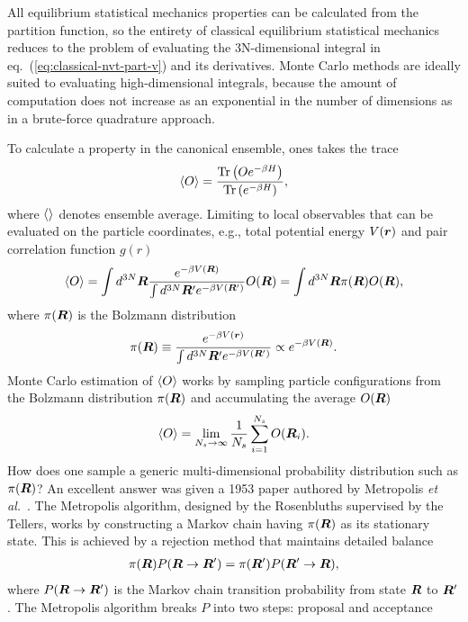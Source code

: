 All equilibrium statistical mechanics properties can be calculated from the partition function, so the entirety of classical equilibrium statistical mechanics reduces to the problem of evaluating the 3N-dimensional integral in eq.~(\ref{eq:classical-nvt-part-v}) and its derivatives. Monte Carlo methods are ideally suited to evaluating high-dimensional integrals, because the amount of computation does not increase as an exponential in the number of dimensions as in a brute-force quadrature approach.

To calculate a property in the canonical ensemble, ones takes the trace
\begin{align}
\braket{O} = \dfrac{\text{Tr}\left(Oe^{-\beta H}\right)}{\text{Tr}\left(e^{-\beta H}\right)},
\end{align}
where $\braket{}$ denotes ensemble average. Limiting to local observables that can be evaluated on the particle coordinates, e.g., total potential energy $V(\boldsymbol{r})$ and pair correlation function $g(r)$
\begin{align} \label{eq:int-obs}
\braket{O} = \int d^{3N}\boldsymbol{R} \dfrac{e^{-\beta V(\boldsymbol{R})}}{\int d^{3N}\boldsymbol{R}' e^{-\beta V(\boldsymbol{R}')}} O(\boldsymbol{R}) = \int d^{3N}\boldsymbol{R} \pi(\boldsymbol{R})O(\boldsymbol{R}),
\end{align}
where $\pi(\boldsymbol{R})$ is the Bolzmann distribution
\begin{align} \label{eq:bolzmann-pi}
\pi(\boldsymbol{R}) \equiv \dfrac{e^{-\beta V(\boldsymbol{r})}}{\int d^{3N}\boldsymbol{R}' e^{-\beta V(\boldsymbol{R}')}} \propto e^{-\beta V(\boldsymbol{R})}.
\end{align}
Monte Carlo estimation of $\braket{O}$ works by sampling particle configurations from the Bolzmann distribution $\pi(\boldsymbol{R})$ and accumulating the average $O(\boldsymbol{R})$
\begin{align}
\braket{O} = \lim\limits_{N_s\rightarrow\infty} \frac{1}{N_s} \sum\limits_{i=1}^{N_s} O(\boldsymbol{R}_i).
\end{align}
How does one sample a generic multi-dimensional probability distribution such as $\pi(\boldsymbol{R})$?
An excellent answer was given a 1953 paper authored by Metropolis \textit{et al.}~\cite{Metropolis1953}. The Metropolis algorithm, designed by the Rosenbluths supervised by the Tellers, works by constructing a Markov chain having $\pi(\boldsymbol{R})$ as its stationary state. This is achieved by a rejection method that maintains detailed balance
\begin{align} \label{eq:detailed-balance}
\pi(\boldsymbol{R})P(\boldsymbol{R}\rightarrow\boldsymbol{R}')=\pi(\boldsymbol{R}')P(\boldsymbol{R}'\rightarrow\boldsymbol{R}),
\end{align}
where $P(\boldsymbol{R}\rightarrow\boldsymbol{R}')$ is the Markov chain transition probability from state $\boldsymbol{R}$ to $\boldsymbol{R}'$. The Metropolis algorithm breaks $P$ into two steps: proposal and acceptance
